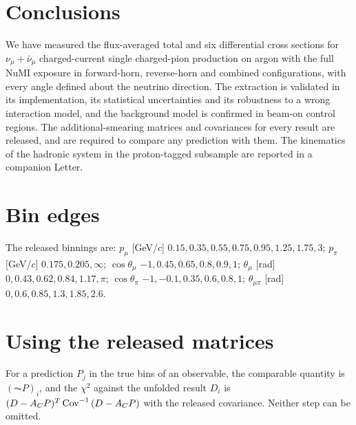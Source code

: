 \documentclass[aps,prd,twocolumn,superscriptaddress,nofootinbib,floatfix]{revtex4-2}
\begin{document}
\section{Conclusions}

We have measured the flux-averaged total and six differential cross sections for
$\nu_\mu+\bar\nu_\mu$ charged-current single charged-pion production on argon with the full
\uboone{} NuMI exposure in forward-horn, reverse-horn and combined configurations, with every
angle defined about the neutrino direction. The extraction is validated in its implementation, its
statistical uncertainties and its robustness to a wrong interaction model, and the background model
is confirmed in beam-on control regions. The additional-smearing matrices and covariances for every
result are released, and are required to compare any prediction with them. The kinematics of the
hadronic system in the proton-tagged subsample are reported in a companion Letter.

\begin{acknowledgments}
\end{acknowledgments}

\appendix
\section{Bin edges}
The released binnings are: $p_\mu$ [GeV/$c$] $0.15,0.35,0.55,0.75,0.95,1.25,1.75,3$;
$p_\pi$ [GeV/$c$] $0.175,0.205,\infty$; $\cos\theta_\mu$ $-1,0.45,0.65,0.8,0.9,1$;
$\theta_\mu$ [rad] $0,0.43,0.62,0.84,1.17,\pi$; $\cos\theta_\pi$ $-1,-0.1,0.35,0.6,0.8,1$;
$\theta_{\mu\pi}$ [rad] $0,0.6,0.85,1.3,1.85,2.6$.

\section{Using the released matrices}
For a prediction $P_j$ in the true bins of an observable, the comparable quantity is
$(\AC P)_i$, and the $\chi^2$ against the unfolded result $D_i$ is
$(D-A_C P)^T\,{\rm Cov}^{-1}\,(D-A_C P)$ with the released covariance. Neither step can be omitted.


\end{document}
